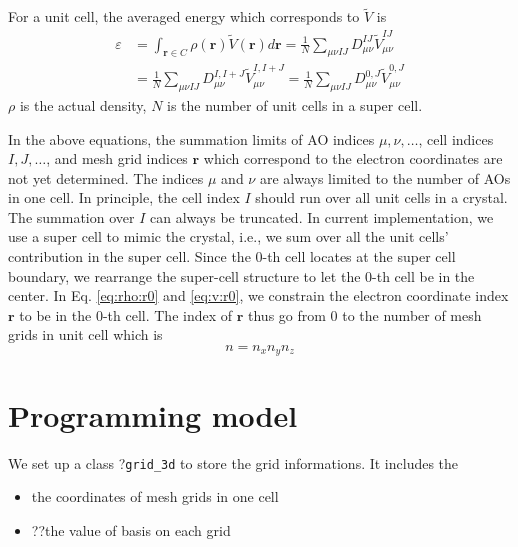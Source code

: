 \documentclass{article}
\begin{document}
For a unit cell, the averaged energy which corresponds to $\tilde{V}$ is
\begin{align}
  \varepsilon &= \int_{\mathbf{r}\in C} \rho(\mathbf{r})\tilde{V}(\mathbf{r}) d\mathbf{r}
  = \frac{1}{N}\sum_{\mu\nu IJ} D_{\mu\nu}^{IJ} \tilde{V}_{\mu\nu}^{IJ}
  \\
  &=\frac{1}{N}\sum_{\mu\nu IJ} D_{\mu\nu}^{I,I+J} \tilde{V}_{\mu\nu}^{I,I+J}
  = \frac{1}{N}\sum_{\mu\nu IJ} D_{\mu\nu}^{0,J} \tilde{V}_{\mu\nu}^{0,J}
  \label{}
\end{align}
$\rho$ is the actual density, $N$ is the number of unit cells in a super cell.

In the above equations, the summation limits of AO indices $\mu,\nu,\dots$,
cell indices $I,J,\dots$, and mesh grid indices $\mathbf{r}$ which correspond
to the electron coordinates are not yet determined.
The indices $\mu$ and $\nu$ are always limited to the number of AOs in one cell.
In principle, the cell index $I$ should run over all unit cells in a
crystal.  The summation over $I$ can always be truncated.
In current implementation, we use a super cell to mimic the crystal,
i.e., we sum over all the unit cells' contribution in the super cell.
Since the 0-th cell locates at the super cell boundary, we rearrange the
super-cell structure to let the 0-th cell be in the center.
In Eq. \eqref{eq:rho:r0} and \eqref{eq:v:r0}, we constrain the electron
coordinate index $\mathbf{r}$ to be in the $0$-th cell.
The index of $\mathbf{r}$ thus go from 0 to the number of mesh grids in unit
cell which is
\begin{equation}
  n = n_x n_y n_z
  \label{}
\end{equation}


\section{Programming model}
We set up a class ?\verb$grid_3d$ to store the
grid informations. It includes the
\begin{itemize}
  \item the coordinates of mesh grids in one cell
  \item ??the value of basis on each grid
\end{itemize}
\end{document}
